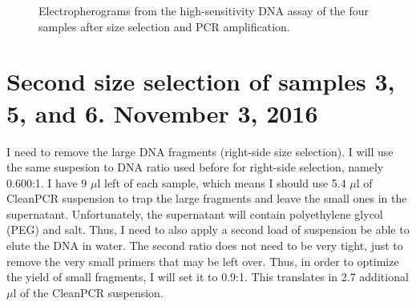 \documentclass[a4paper,12pt]{article}
\begin{document}
\begin{figure}
\caption{Electropherograms from the high-sensitivity DNA assay of the four samples after size selection and PCR amplification.}\label{fig:expected}
\end{figure}


\section{Second size selection of samples 3, 5, and 6. November 3, 2016}
I need to remove the large DNA fragments (right-side size selection). I will use the same suspesion to DNA ratio used before for right-side selection, namely 0.600:1. I have 9 $\mu$l left of each sample, which means I should use 5.4 $\mu$l of CleanPCR suspension to trap the large fragments and leave the small ones in the supernatant. Unfortunately, the supernatant will contain polyethylene glycol (PEG) and salt. Thus, I need to also apply a second load of suspension be able to elute the DNA in water. The second ratio does not need to be very tight, just to remove the very small primers that may be left over. Thus, in order to optimize the yield of small fragments, I will set it to 0.9:1. This translates in 2.7 additional $\mu$l of the CleanPCR suspension. 




\end{document}

